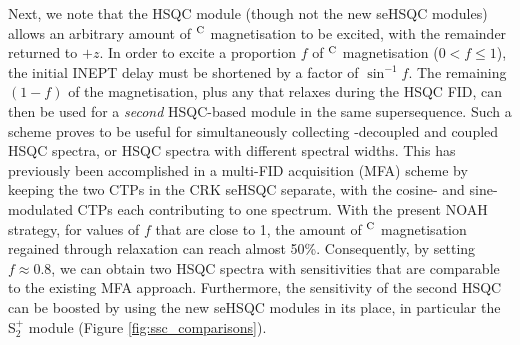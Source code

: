 \documentclass[11pt]{article}
\newcommand*{\noahSpb}{S$^+_2$}
\newcommand*{\hl}[1]{\textcolor{WildStrawberry}{#1}}
\newcommand*{\carbon}{\ce{^{13}C}}
\newcommand*{\magn}[1]{\ce{^1H}$^{#1}$}
\newcommand*{\figref}[1]{Figure \ref{fig:#1}}
\begin{document}
Next, we note that the HSQC module (though not the new seHSQC modules) allows an arbitrary amount of \magn{\ce{C}} magnetisation to be excited, with the remainder returned to $+z$.  In order to excite a proportion $f$ of \magn{\ce{C}} magnetisation ($0 < f \leq 1$), the initial INEPT delay must be shortened by a factor of $\sin^{-1}f$.
The remaining $(1 - f)$ of the magnetisation, plus any that relaxes during the HSQC FID, can then be used for a \textit{second} HSQC-based module in the same supersequence.
Such a scheme proves to be useful for simultaneously collecting \carbon{}-decoupled and coupled HSQC spectra, or HSQC spectra with different spectral widths.
This has previously been accomplished in a multi-FID acquisition (MFA) scheme by keeping the two CTPs in the CRK seHSQC separate, with the cosine- and sine-modulated CTPs each contributing to one spectrum.\autocite{ctphsqc}
With the present NOAH strategy, for values of $f$ that are close to 1, the amount of \magn{\ce{C}} magnetisation regained through relaxation can reach almost 50\%.
Consequently, by setting $f \approx 0.8$, we can obtain two HSQC spectra with sensitivities that are comparable to the existing MFA approach.
Furthermore, the sensitivity of the second HSQC can be boosted by using \hl{the new seHSQC modules in its place, in particular the \noahSpb{} module (\figref{ssc_comparisons})}.
\end{document}
